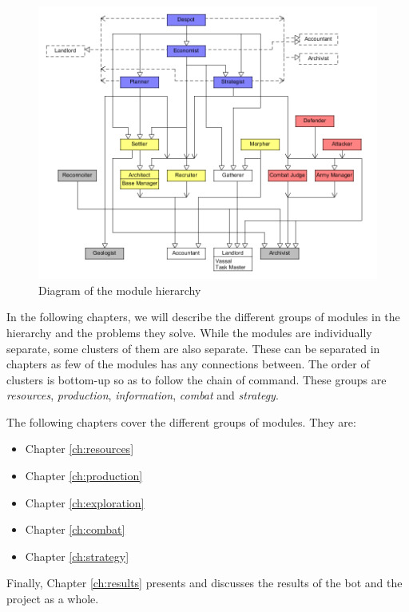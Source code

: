 \begin{figure}
	\centering
	\includegraphics[width=\textwidth]{figures/Hierarchy}
\caption{Diagram of the module hierarchy}
\label{fig:hierarchy}
\end{figure}


In the following chapters, we will describe the different groups of modules in the hierarchy and the problems they solve. While the modules are individually separate, some clusters of them are also separate. These can be separated in chapters as few of the modules has any connections between. The order of clusters is bottom-up so as to follow the chain of command. These groups are \emph{resources}, \emph{production}, \emph{information}, \emph{combat} and \emph{strategy}.

The following chapters cover the different groups of modules. They are:
\begin{itemize}
	\item Chapter \ref{ch:resources}
	\item Chapter \ref{ch:production}
	\item Chapter \ref{ch:exploration}
	\item Chapter \ref{ch:combat}
	\item Chapter \ref{ch:strategy}
\end{itemize}

Finally, Chapter \ref{ch:results} presents and discusses the results of the bot and the project as a whole.

